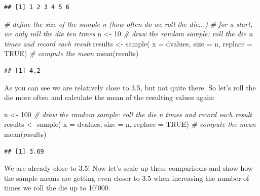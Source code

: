 \documentclass[
  12pt,
]{style/krantz}
\newenvironment{Shaded}{\begin{snugshade}}{\end{snugshade}}
\newcommand{\AttributeTok}[1]{\textcolor[rgb]{0.77,0.63,0.00}{#1}}
\newcommand{\CommentTok}[1]{\textcolor[rgb]{0.56,0.35,0.01}{\textit{#1}}}
\newcommand{\ConstantTok}[1]{\textcolor[rgb]{0.00,0.00,0.00}{#1}}
\newcommand{\DecValTok}[1]{\textcolor[rgb]{0.00,0.00,0.81}{#1}}
\newcommand{\FunctionTok}[1]{\textcolor[rgb]{0.00,0.00,0.00}{#1}}
\newcommand{\NormalTok}[1]{#1}
\newcommand{\OtherTok}[1]{\textcolor[rgb]{0.56,0.35,0.01}{#1}}
\begin{document}
\begin{verbatim}
## [1] 1 2 3 4 5 6
\end{verbatim}

\begin{Shaded}
\begin{Highlighting}[]
\CommentTok{\# define the size of the sample n (how often do we roll the die...)}
\CommentTok{\# for a start, we only roll the die ten times}
\NormalTok{n }\OtherTok{\textless{}{-}} \DecValTok{10}
\CommentTok{\# draw the random sample: \textquotesingle{}roll the die n times and record each result\textquotesingle{}}
\NormalTok{results }\OtherTok{\textless{}{-}} \FunctionTok{sample}\NormalTok{( }\AttributeTok{x =}\NormalTok{ dvalues, }\AttributeTok{size =}\NormalTok{ n, }\AttributeTok{replace =} \ConstantTok{TRUE}\NormalTok{)}
\CommentTok{\# compute the mean}
\FunctionTok{mean}\NormalTok{(results)}
\end{Highlighting}
\end{Shaded}

\begin{verbatim}
## [1] 4.2
\end{verbatim}

As you can see we are relatively close to 3.5, but not quite there. So let's roll the die more often and calculate the mean of the resulting values again:

\begin{Shaded}
\begin{Highlighting}[]
\NormalTok{n }\OtherTok{\textless{}{-}} \DecValTok{100}
\CommentTok{\# draw the random sample: \textquotesingle{}roll the die n times and record each result\textquotesingle{}}
\NormalTok{results }\OtherTok{\textless{}{-}} \FunctionTok{sample}\NormalTok{( }\AttributeTok{x =}\NormalTok{ dvalues, }\AttributeTok{size =}\NormalTok{ n, }\AttributeTok{replace =} \ConstantTok{TRUE}\NormalTok{)}
\CommentTok{\# compute the mean}
\FunctionTok{mean}\NormalTok{(results)}
\end{Highlighting}
\end{Shaded}

\begin{verbatim}
## [1] 3.69
\end{verbatim}

We are already close to 3.5! Now let's scale up these comparisons and show how the sample means are getting even closer to 3.5 when increasing the number of times we roll the die up to 10'000.
\end{document}
